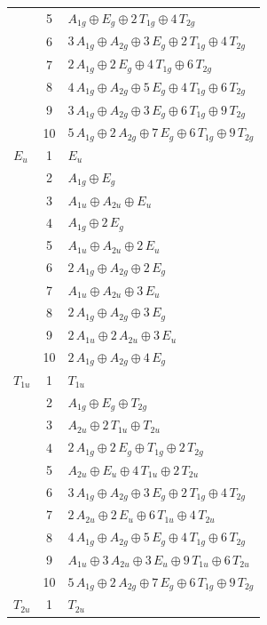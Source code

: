\documentclass[11pt]{article}
\begin{document}
\begin{longtable}{l c p{}}
 & 5 & $A_{1g}\oplus E_{g}\oplus 2\,T_{1g}\oplus 4\,T_{2g}$\\
 & 6 & $3\,A_{1g}\oplus A_{2g}\oplus 3\,E_{g}\oplus 2\,T_{1g}\oplus 4\,T_{2g}$\\
 & 7 & $2\,A_{1g}\oplus 2\,E_{g}\oplus 4\,T_{1g}\oplus 6\,T_{2g}$\\
 & 8 & $4\,A_{1g}\oplus A_{2g}\oplus 5\,E_{g}\oplus 4\,T_{1g}\oplus 6\,T_{2g}$\\
 & 9 & $3\,A_{1g}\oplus A_{2g}\oplus 3\,E_{g}\oplus 6\,T_{1g}\oplus 9\,T_{2g}$\\
 & 10 & $5\,A_{1g}\oplus 2\,A_{2g}\oplus 7\,E_{g}\oplus 6\,T_{1g}\oplus 9\,T_{2g}$\\
\hline
$E_{u}$ & 1 & $E_{u}$\\
 & 2 & $A_{1g}\oplus E_{g}$\\
 & 3 & $A_{1u}\oplus A_{2u}\oplus E_{u}$\\
 & 4 & $A_{1g}\oplus 2\,E_{g}$\\
 & 5 & $A_{1u}\oplus A_{2u}\oplus 2\,E_{u}$\\
 & 6 & $2\,A_{1g}\oplus A_{2g}\oplus 2\,E_{g}$\\
 & 7 & $A_{1u}\oplus A_{2u}\oplus 3\,E_{u}$\\
 & 8 & $2\,A_{1g}\oplus A_{2g}\oplus 3\,E_{g}$\\
 & 9 & $2\,A_{1u}\oplus 2\,A_{2u}\oplus 3\,E_{u}$\\
 & 10 & $2\,A_{1g}\oplus A_{2g}\oplus 4\,E_{g}$\\
\hline
$T_{1u}$ & 1 & $T_{1u}$\\
 & 2 & $A_{1g}\oplus E_{g}\oplus T_{2g}$\\
 & 3 & $A_{2u}\oplus 2\,T_{1u}\oplus T_{2u}$\\
 & 4 & $2\,A_{1g}\oplus 2\,E_{g}\oplus T_{1g}\oplus 2\,T_{2g}$\\
 & 5 & $A_{2u}\oplus E_{u}\oplus 4\,T_{1u}\oplus 2\,T_{2u}$\\
 & 6 & $3\,A_{1g}\oplus A_{2g}\oplus 3\,E_{g}\oplus 2\,T_{1g}\oplus 4\,T_{2g}$\\
 & 7 & $2\,A_{2u}\oplus 2\,E_{u}\oplus 6\,T_{1u}\oplus 4\,T_{2u}$\\
 & 8 & $4\,A_{1g}\oplus A_{2g}\oplus 5\,E_{g}\oplus 4\,T_{1g}\oplus 6\,T_{2g}$\\
 & 9 & $A_{1u}\oplus 3\,A_{2u}\oplus 3\,E_{u}\oplus 9\,T_{1u}\oplus 6\,T_{2u}$\\
 & 10 & $5\,A_{1g}\oplus 2\,A_{2g}\oplus 7\,E_{g}\oplus 6\,T_{1g}\oplus 9\,T_{2g}$\\
\hline
$T_{2u}$ & 1 & $T_{2u}$\\

\end{longtable}
\end{document}
